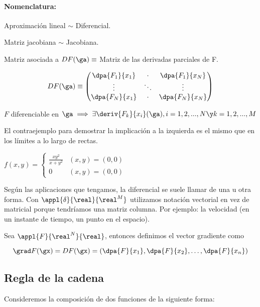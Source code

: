 \documentclass{apuntes}
\begin{document}
\paragraph{Nomenclatura: }
Aproximación lineal $\sim$ Diferencial.

Matriz jacobiana $\sim$ Jacobiana.

\begin{defn}
 Matriz asociada a $DF(\ga) \equiv $ Matriz de las derivadas parciales de F.
 
 $$DF(\ga) \equiv \begin{pmatrix}
                \dpa{F_1}{x_1} & \cdot & \dpa{F_1}{x_N}\\
                \vdots& \ddots & \vdots\\
                \dpa{F_N}{x_1} & \cdot & \dpa{F_N}{x_N}
                \end{pmatrix}
$$
\end{defn}

\begin{theorem}
 $F$ diferenciable en $\ga \implies \exists \deriv{F_k}{x_i}(\ga), i=1,2,...,N \y k = 1,2,...,M$
\end{theorem}

El contraejemplo para demostrar la implicación a la izquierda es el mismo que en los límites a lo largo de rectas.

$f(x,y) = \left\{ \begin{matrix}

\frac{xy^2}{x+y^2} & (x,y) = (0,0) \\ 
0 & (x,y)=(0,0)
           
          \end{matrix}\right.
$

Según las aplicaciones que tengamos, la diferencial se suele llamar de una u otra forma. Con $\appl{\delta}{\real}{\real^M}$ utilizamos notación vectorial en vez de matricial porque tendríamos una matriz columna. Por ejemplo: la velocidad (en un instante de tiempo, un punto en el espacio).

\begin{defn}[Gradiente] Sea $\appl{F}{\real^N}{\real}$, entonces definimos el vector gradiente como 

\[ \grad F(\gx) = DF(\gx) = \left(\dpa{F}{x_1}, \dpa{F}{x_2},\dotsc, \dpa{F}{x_n}\right) \]
\end{defn}


\subsection{Regla de la cadena}
Consideremos la composición de dos funciones de la siguiente forma:
\end{document}
